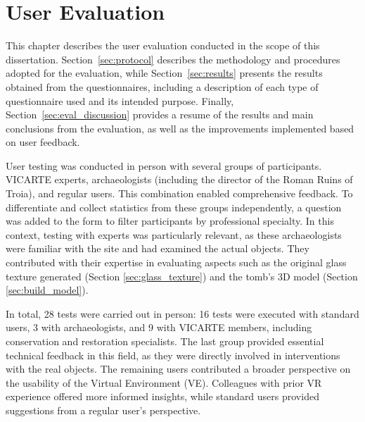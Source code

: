 
%

\chapter{User Evaluation}
\label{cha:user_evaluation}
\setlength{\parskip}{0pt} 

This chapter describes the user evaluation conducted in the scope of this dissertation. 
Section~\ref{sec:protocol} describes the methodology and procedures adopted for the evaluation, while Section~\ref{sec:results} presents the results obtained from the questionnaires, including a description of each type of questionnaire used and its intended purpose.
Finally, Section~\ref{sec:eval_discussion} provides a resume of the results and main conclusions from the evaluation, as well as the improvements implemented based on user feedback.

User testing was conducted in person with several groups of participants. \gls{VICARTE} experts, archaeologists (including the director of the Roman Ruins of Troia), and regular users. This combination enabled comprehensive feedback.
To differentiate and collect statistics from these groups independently, a question was added to the form to filter participants by professional specialty.
In this context, testing with experts was particularly relevant, as these archaeologists were familiar with the site and had examined the actual objects. They contributed with their expertise in evaluating aspects such as the original glass texture generated (Section \ref{sec:glass_texture}) and the tomb’s \gls{3D} model (Section \ref{sec:build_model}).

In total, 28 tests were carried out in person: 16 tests were executed with standard users, 3 with archaeologists, and 9 with \gls{VICARTE} members, including conservation and restoration specialists. The last group provided essential technical feedback in this field, as they were directly involved in interventions with the real objects.
The remaining users contributed a broader perspective on the usability of the Virtual Environment (\gls{VE}). Colleagues with prior \gls{VR} experience offered more informed insights, while standard users provided suggestions from a regular user’s perspective.

